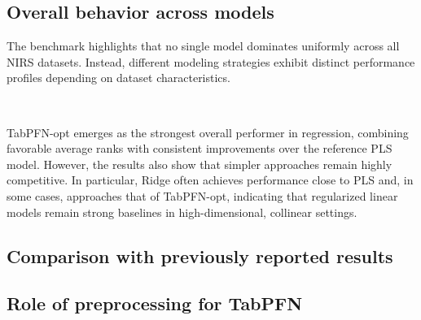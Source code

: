 \documentclass{article}
\begin{document}
\subsection{Overall behavior across models}

The benchmark highlights that no single model dominates uniformly across all NIRS datasets. Instead, different modeling strategies exhibit distinct performance profiles depending on dataset characteristics.

~

TabPFN-opt emerges as the strongest overall performer in regression, combining favorable average ranks with consistent improvements over the reference PLS model. However, the results also show that simpler approaches remain highly competitive. In particular, Ridge often achieves performance close to PLS and, in some cases, approaches that of TabPFN-opt, indicating that regularized linear models remain strong baselines in high-dimensional, collinear settings.


\subsection{Comparison with previously reported results}



\subsection{Role of preprocessing for TabPFN}
\end{document}
